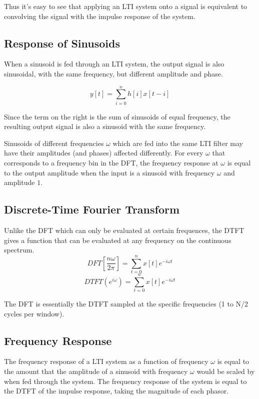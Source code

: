 \begin{center}\end{center}

Thus it's easy to see that applying an LTI system onto a signal is equivalent to 
convolving the signal with the impulse response of the system.

\subsection{Response of Sinusoids}
When a sinusoid is fed through an LTI system, the output signal is also sinusoidal,
with the same frequency, but different amplitude and phase.

$$y[t]=\sum_{i=0}^n h[i]x[t-i]$$

Since the term on the right is the sum of sinusoids of equal frequency,
the resulting output signal is also a sinusoid with the same frequency.

Sinusoids of different frequencies $\omega$ which are fed into the same LTI filter
may have their amplitudes (and phases) affected differently. 
For every $\omega$ that corresponds to a frequency bin in the DFT, 
the frequency response at $\omega$ is equal to the output amplitude when the input
is a sinusoid with frequency $\omega$ and amplitude $1$.

\pagebreak

\subsection{Discrete-Time Fourier Transform}
Unlike the DFT which can only be evaluated at certain frequences, 
the DTFT gives a function that can be evaluated at any frequency on the continuous spectrum.
$$DFT\left[\frac{n\omega}{2\pi}\right]=\sum_{t=0}^nx[t]e^{-i\omega t}$$
$$DTFT(e^{i\omega})=\sum_{t=0}^nx[t]e^{-i\omega t}$$

The DFT is essentially the DTFT sampled at the specific frequencies (1 to N/2 cycles per window).

\subsection{Frequency Response}
The frequency response of a LTI system as a function of frequency $\omega$ is equal
to the amount that the amplitude of a sinusoid with frequency $\omega$ would be scaled by when fed through the system.
The frequency response of the system is equal to the DTFT of the impulse response,
taking the magnitude of each phasor.

